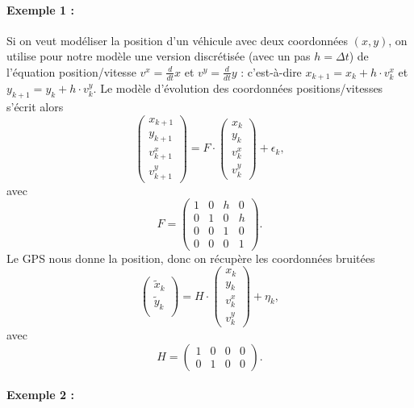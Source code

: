 \documentclass[a4paper,12pt]{book}
\begin{document}
\paragraph{Exemple 1 :}

Si on veut modéliser la position d'un véhicule avec deux coordonnées $(x,y)$, on utilise pour notre modèle une version discrétisée (avec un pas $h=\Delta t$) de l'équation position/vitesse $v^x=\frac{d}{dt}x$ et  $v^y=\frac{d}{dt}y$ : c'est-à-dire $x_{k+1}=x_{k}+h\cdot v^x_k$ et $y_{k+1}=y_{k}+h\cdot v^y_k$. Le modèle d'évolution des coordonnées positions/vitesses s'écrit alors
$$\left(\begin{array}{c}
x_{k+1}\\
y_{k+1}\\
v^x_{k+1}\\
v^y_{k+1}
\end{array} \right) =F\cdot \left(\begin{array}{c}
x_{k}\\
y_{k}\\
v^x_{k}\\
v^y_{k}
\end{array} \right) +\epsilon_k,$$
avec
$$F=\left(\begin{array}{cccc}
1&0&h&0\\
0&1&0&h\\
0&0&1&0\\
0&0&0&1
\end{array}\right).$$
Le GPS nous donne la position, donc on récupère les coordonnées bruitées
$$\left(\begin{array}{c}
\tilde{x}_{k}\\
\tilde{y}_{k}\\
\end{array} \right) =H\cdot \left(\begin{array}{c}
x_{k}\\
y_{k}\\
v^x_{k}\\
v^y_{k}
\end{array} \right) +\eta_k,$$
avec
$$H= \left(\begin{array}{cccc}
1&0&0&0\\
0&1&0&0
\end{array}\right).$$

\paragraph{Exemple 2 :}
\end{document}
